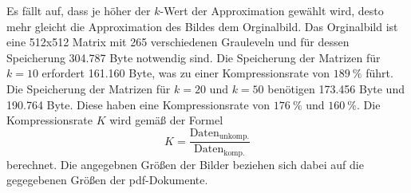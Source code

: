 Es fällt auf, dass je höher der $k$-Wert der Approximation gewählt wird, desto mehr gleicht die Approximation des Bildes dem Orginalbild.
Das Orginalbild ist eine 512x512 Matrix mit 265 verschiedenen Grauleveln und für dessen Speicherung 304.787 Byte notwendig sind.
Die Speicherung der Matrizen für $k=10$ erfordert 161.160 Byte, was zu einer Kompressionsrate von $\SI{189}{\percent}$ führt.
Die Speicherung der Matrizen für $k=20$ und $k=50$ benötigen 173.456 Byte und 190.764 Byte. Diese haben eine Kompressionsrate von
$\SI{176}{\percent}$ und $\SI{160}{\percent}$.
Die Kompressionsrate $K$ wird gemäß der Formel
\begin{equation}
  K=\frac{\text{Daten}_{\text{unkomp.}}}{\text{Daten}_{\text{komp.}}}
\end{equation}
berechnet. Die angegebnen Größen der Bilder beziehen sich dabei auf die gegegebenen Größen der pdf-Dokumente.

